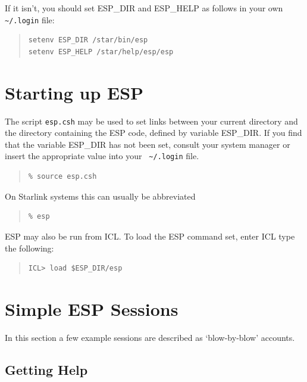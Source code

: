 \documentclass[twoside,11pt]{article}
\newenvironment{myquote}{\begin{quote}\begin{small}}{\end{small}\end{quote}}
\begin{document}
If it isn't, you should set ESP\_DIR and ESP\_HELP as follows in your own 
{\verb+ ~/.login+} file:

\begin{myquote}
\begin{verbatim}
setenv ESP_DIR /star/bin/esp
setenv ESP_HELP /star/help/esp/esp
\end{verbatim}
\end{myquote}

\section{Starting up ESP}
\label{sec:starting}

The script {\tt esp.csh} may be used to set links between your current
directory and the directory containing the ESP code, defined by
variable ESP\_DIR.  If you find that the variable ESP\_DIR has not been
set, consult your system manager or insert the appropriate value into
your {\verb+ ~/.login+} file.

\begin{myquote}
\begin{verbatim}
% source esp.csh
\end{verbatim}
\end{myquote}
On Starlink systems this can usually be abbreviated
\begin{myquote}
\begin{verbatim}
% esp
\end{verbatim}
\end{myquote}

ESP may also be run from ICL. To load the ESP command set, enter ICL type
the following:

\begin{myquote}
\begin{verbatim}
ICL> load $ESP_DIR/esp
\end{verbatim}
\end{myquote}
 
\section{Simple ESP Sessions}
\label{sec:session}

In this section a few example sessions are described as `blow-by-blow' 
accounts. 


\subsection{Getting Help}
\end{document}
